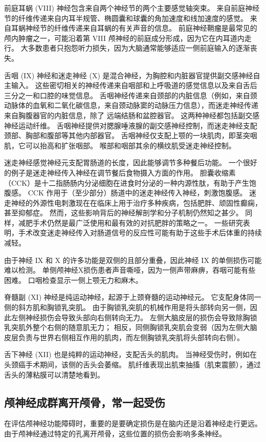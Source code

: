 前庭耳蜗 (VIII) 神经包含来自两个神经节的两个主要感觉轴突束。 来自前庭神经节的纤维传递来自内耳半规管、椭圆囊和球囊的角加速度和线加速度的感觉。 来自耳蜗神经节的纤维传递来自耳蜗的有关声音的信息。 前庭神经鞘瘤是最常见的颅内肿瘤之一，可能沿着第 VIII 颅神经的前庭成分形成，因为它在内耳道内走行。 大多数患者只抱怨听力损失，因为大脑通常能够适应一侧前庭输入的逐渐丧失。

舌咽 (IX) 神经和迷走神经 (X) 是混合神经，为胸腔和内脏器官提供副交感神经自主输入。 这些密切相关的神经传递来自咽部和上呼吸道的感觉信息以及来自舌后三分之一和口腔的味觉信息。 舌咽神经传递来自颈部的内脏信息（例如，来自颈动脉体的血氧和二氧化碳信息，来自颈动脉窦的动脉压力信息），而迷走神经传递来自胸腹器官的内脏信息，除了 远端结肠和盆腔器官。 这两种神经都包括副交感神经运动纤维。 舌咽神经提供对腮腺唾液腺的副交感神经控制，而迷走神经支配颈部、胸部和腹部等其他内部器官。 舌咽神经仅支配上颚的一块肌肉，即茎突咽肌，它可以抬高和扩张咽部。 喉部和咽部其余的横纹肌受迷走神经控制。

迷走神经感觉神经元支配胃肠道的长度，因此能够调节多种餐后功能。 一个很好的例子是迷走神经传入神经在调节餐后食物摄入方面的作用。 胆囊收缩素（CCK）是十二指肠肠内分泌细胞在进食时分泌的一种内源性肽，有助于产生饱腹感。 CCK 作用于（至少部分）肠道中的迷走神经传入神经，刺激饱腹感。 迷走神经的外源性电刺激现在在临床上用于治疗多种疾病，包括肥胖、顽固性癫痫，甚至抑郁症。 然而，这些影响背后的神经解剖学和分子机制仍然知之甚少。 同样，减肥手术仍然是最广泛使用和最有效的对抗肥胖的策略之一。 一些研究表明，手术改变迷走神经传入对肠道信号的反应性可能有助于这些手术后体重的持续减轻。

由于神经 IX 和 X 的许多功能是双侧的且部分重叠，因此神经 IX 的单侧损伤可能难以检测。 单侧颅神经X损伤患者声音嘶哑，因为一侧声带麻痹，吞咽可能有些困难。 口咽检查显示一侧上颚无力和麻木。

脊髓副 (XI) 神经是纯运动神经，起源于上颈脊髓的运动神经元。 它支配身体同一侧的斜方肌和胸锁乳突肌。 由于胸锁乳突肌的机械作用是将头部转向另一侧，因此左侧神经损伤会导致头部向右侧转向无力。 左侧大脑皮层的损伤会导致除胸锁乳突肌外整个右侧的随意肌无力； 相反，同侧胸锁乳突肌会变弱（因为左侧大脑皮层负责与世界右侧相互作用的肌肉，而左侧胸锁乳突肌将头部转向右侧）。

舌下神经 (XII) 也是纯粹的运动神经，支配舌头的肌肉。 当神经受伤时，例如在头颈癌手术期间，该侧的舌头会萎缩。 肌纤维表现出肌束抽搐（肌束震颤），通过舌头的薄粘膜可以清楚地看到。


\subsection{颅神经成群离开颅骨，常一起受伤}
在评估颅神经功能障碍时，重要的是要确定损伤是在脑内还是沿着神经走行更远。 由于颅神经通过特定的孔离开颅骨，这些位置的损伤会影响多条神经。


